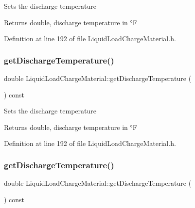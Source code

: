 Sets the discharge temperature \begin{DoxyReturn}{Returns}
double, discharge temperature in °F 
\end{DoxyReturn}


Definition at line 192 of file Liquid\+Load\+Charge\+Material.\+h.

\mbox{\label{class_liquid_load_charge_material_ad474f33059c99aa94e1d63738e11ff0e}} 
\subsubsection{\texorpdfstring{get\+Discharge\+Temperature()}{getDischargeTemperature()}\hspace{0.1cm}{\footnotesize\ttfamily [2/3]}}
{\footnotesize\ttfamily double Liquid\+Load\+Charge\+Material\+::get\+Discharge\+Temperature (\begin{DoxyParamCaption}{ }\end{DoxyParamCaption}) const\hspace{0.3cm}{\ttfamily [inline]}}

Sets the discharge temperature \begin{DoxyReturn}{Returns}
double, discharge temperature in °F 
\end{DoxyReturn}


Definition at line 192 of file Liquid\+Load\+Charge\+Material.\+h.

\mbox{\label{class_liquid_load_charge_material_ad474f33059c99aa94e1d63738e11ff0e}} 
\subsubsection{\texorpdfstring{get\+Discharge\+Temperature()}{getDischargeTemperature()}\hspace{0.1cm}{\footnotesize\ttfamily [3/3]}}
{\footnotesize\ttfamily double Liquid\+Load\+Charge\+Material\+::get\+Discharge\+Temperature (\begin{DoxyParamCaption}{ }\end{DoxyParamCaption}) const\hspace{0.3cm}{\ttfamily [inline]}}


